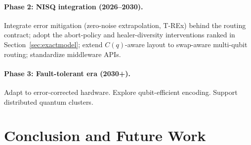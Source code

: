 ﻿\documentclass[12pt,a4paper]{article}
\begin{document}
\paragraph{Phase 2: NISQ integration (2026--2030).} Integrate error mitigation (zero-noise extrapolation, T-REx) behind the routing contract; adopt the abort-policy and healer-diversity interventions ranked in Section~\ref{sec:exactmodel}; extend $C(q)$-aware layout to swap-aware multi-qubit routing; standardize middleware APIs.

\paragraph{Phase 3: Fault-tolerant era (2030+).} Adapt to error-corrected hardware. Explore qubit-efficient encoding. Support distributed quantum clusters.


\section{Conclusion and Future Work}\label{sec:conclusion}
\end{document}
